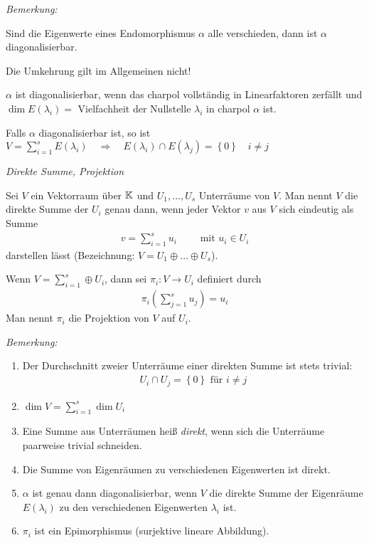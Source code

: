 \textit{Bemerkung:}

Sind die Eigenwerte eines Endomorphismus $\alpha$ alle verschieden, dann ist $\alpha$ diagonalisierbar.
\begin{center}
Die Umkehrung gilt im Allgemeinen nicht!
\end{center}
$\alpha$ ist diagonalisierbar, wenn das charpol vollständig in Linearfaktoren zerfällt und $\dim E(\lambda_i)=$ Vielfachheit der Nullstelle 
$\lambda_i$ in charpol $\alpha$ ist.

Falls $\alpha$ diagonalisierbar ist, so ist $V=\sum\limits_{i=1}^s E(\lambda_i) \quad \Rightarrow \quad E\left( \lambda_i \right) \cap E \left( \lambda_j \right) = \left\{ 0 \right\} \quad i \neq j$

\begin{mydef} \textit{Direkte Summe, Projektion}

    Sei $V$ ein Vektorraum über $\mathbb{K}$ und $U_1,\ldots,U_s$ Unterräume von $V$. Man nennt $V$ die direkte Summe der $U_i$ genau dann, wenn jeder Vektor $v$ aus $V$ sich eindeutig als Summe
    \begin{align*}
        v=\sum_{i=1}^s u_i \qquad \mbox{ mit } u_i\in U_i
    \end{align*}
    darstellen lässt (Bezeichnung: $V = U_1 \oplus \ldots \oplus U_s$).

    Wenn $V = \sum\limits_{i=1}^s \oplus U_i$, dann sei $\pi_i:V\rightarrow U_i$ definiert durch
    \begin{align*}
        \pi_i \left( \sum_{j=1}^s u_j \right) = u_i
    \end{align*}
    Man nennt $\pi_i$ die Projektion von $V$ auf $U_i$.
\end{mydef}

\textit{Bemerkung:}
\begin{enumerate}
    \item Der Durchschnitt zweier Unterräume einer direkten Summe ist stets trivial:
        \begin{align*}
            U_i \cap U_j = \left\{  0 \right\} \mbox{ für } i \neq j
        \end{align*}
    \item $\dim V=\sum\limits_{i=1}^s\dim U_i$
    \item Eine Summe aus Unterräumen heiß \textit{direkt}, wenn sich die Unterräume paarweise trivial schneiden.
    \item Die Summe von Eigenräumen zu verschiedenen Eigenwerten ist direkt.
    \item $\alpha$ ist genau dann diagonalisierbar, wenn $V$ die direkte Summe der Eigenräume $E(\lambda_i)$ zu den verschiedenen Eigenwerten $\lambda_i$ ist.
    \item $\pi_i$ ist ein Epimorphismus (surjektive lineare Abbildung).
\end{enumerate}

